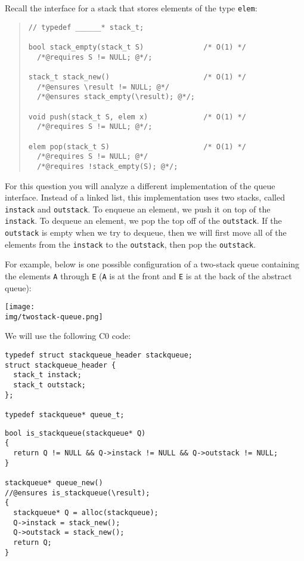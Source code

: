 \clearpage
{}

Recall the interface for a stack that stores elements of the type
\lstinline'elem':

\begin{quote}
\begin{lstlisting}[numbers=none]
// typedef ______* stack_t;

bool stack_empty(stack_t S)              /* O(1) */
  /*@requires S != NULL; @*/;

stack_t stack_new()                      /* O(1) */
  /*@ensures \result != NULL; @*/
  /*@ensures stack_empty(\result); @*/;

void push(stack_t S, elem x)             /* O(1) */
  /*@requires S != NULL; @*/;

elem pop(stack_t S)                      /* O(1) */
  /*@requires S != NULL; @*/
  /*@requires !stack_empty(S); @*/;
\end{lstlisting}
\end{quote}

For this question you will analyze a different implementation of the
queue interface.  Instead of a linked list, this implementation uses
two stacks, called \lstinline'instack' and \lstinline'outstack'. To
enqueue an element, we push it on top of the \lstinline'instack'. To
dequeue an element, we pop the top off of the \lstinline'outstack'. If
the \lstinline'outstack' is empty when we try to dequeue, then we will
first move all of the elements from the \lstinline'instack' to
the \lstinline'outstack', then pop the \lstinline'outstack'.

For example, below is one possible configuration of a two-stack queue
containing the elements \lstinline'A' through \lstinline'E'
(\lstinline'A' is at the front and \lstinline'E' is at the back of the
abstract queue):
\begin{center}
\texttt{[image: \\img/twostack-queue.png]}
\end{center}

We will use the following C0 code:

\begin{lstlisting}
typedef struct stackqueue_header stackqueue;
struct stackqueue_header {
  stack_t instack;
  stack_t outstack;
};

typedef stackqueue* queue_t;
\end{lstlisting}
\clearpage
\begin{lstlisting}[numbers=none]
bool is_stackqueue(stackqueue* Q)
{
  return Q != NULL && Q->instack != NULL && Q->outstack != NULL;
}

stackqueue* queue_new()
//@ensures is_stackqueue(\result);
{
  stackqueue* Q = alloc(stackqueue);
  Q->instack = stack_new();
  Q->outstack = stack_new();
  return Q;
}
\end{lstlisting}


